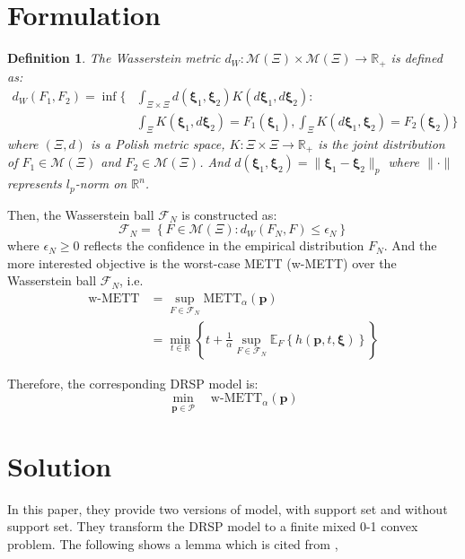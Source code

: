 \documentclass{article}
\newtheorem{defin}{Definition}
\begin{document}
\section{Formulation}

\begin{defin}
	The Wasserstein metric $d_W:\mathcal{M}(\Xi) \times \mathcal{M}(\Xi) \rightarrow \mathbb{R}_+$ is defined as:
	\begin{align}
		d_W(F_1, F_2)  = \inf \Bigg\{ &	\int_{\Xi \times \Xi} d(\bm{\xi}_1, \bm{\xi}_2) K(d \bm{\xi}_1, d\bm{\xi}_2) : \\
		& \int_{\Xi} K(\bm{\xi}_1, d\bm{\xi}_2) = F_1(\bm{\xi}_1), \int_{\Xi} K(d\bm{\xi}_1, \bm{\xi}_2) = F_2(\bm{\xi}_2)  \Bigg\}
	\end{align}
	where $(\Xi, d)$ is a Polish metric space, $K: \Xi \times \Xi \rightarrow \mathbb{R}_+$ is the joint distribution of $F_1 \in \mathcal{M}(\Xi)$ and $F_2 \in \mathcal{M}(\Xi)$. And $d(\bm{\xi}_1, \bm{\xi}_2) = \|\bm{\xi}_1 - \bm{\xi}_2\|_p$ where $\| \cdot \|$ represents $l_p$-norm on $\mathbb{R}^n$.
\end{defin}

Then, the Wasserstein ball $\mathcal{F}_N$ is constructed as:
\begin{equation}
	\mathcal{F}_N = \left\{F \in \mathcal{M}(\Xi) : d_W(F_N, F)\leq \epsilon_N \right\}
\end{equation}
where $\epsilon_N \geq 0$ reflects the confidence in the empirical distribution $F_N$. And the more interested objective is the worst-case METT (w-METT) over the Wasserstein ball $\mathcal{F}_N$, i.e.
\begin{align}
	\text{w-METT} & = \sup_{F \in \mathcal{F}_N} \text{METT}_\alpha (\bm{p}) \\
	& = \min_{t \in \mathbb{R}} \left\{t + \frac{1}{\alpha} \sup_{F \in \mathcal{F}_N} \mathbb{E}_{F}\left\{h(\bm{p}, t, \bm{\xi})\right\}\right\}
\end{align}

Therefore, the corresponding DRSP model is:
\begin{equation}
	\min_{\bm{p} \in \mathcal{P}} \quad \text{w-METT}_\alpha(\bm{p})
\end{equation}

\section{Solution}

In this paper, they provide two versions of model, with support set and without support set. They transform the DRSP model to a finite mixed 0-1 convex problem. The following shows a lemma which is cited from \cite{RN372}, 
\end{document}

